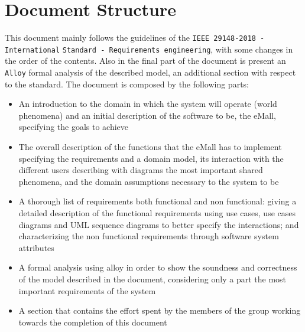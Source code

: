 \section{Document Structure}
\label{sec:Document Structure}%
This document mainly follows the guidelines of the \verb|IEEE 29148-2018 - International| \verb|Standard - Requirements engineering|, with some changes in the order of the contents. Also in the final part of the document is present an \verb|Alloy| formal analysis of the described model, an additional section with respect to the standard.
The document is composed by the following parts:
\begin{itemize}
    \item An introduction to the domain in which the system will operate (world phenomena) and an initial description of the software to be, the eMall, specifying the goals to achieve
    \item The overall description of the functions that the eMall has to implement specifying the requirements and a domain model, its interaction with the different users describing with diagrams the most important shared phenomena, and the domain assumptions necessary to the system to be
    \item A thorough list of requirements both functional and non functional: giving a detailed description of the functional requirements using use cases, use cases diagrams and UML sequence diagrams to better specify the interactions; and characterizing the non functional requirements through software system attributes
    \item A formal analysis using alloy in order to show the soundness and correctness of the model described in the document, considering only a part the most important requirements of the system
    \item A section that contains the effort spent by the members of the group working towards the completion of this document
\end{itemize}

